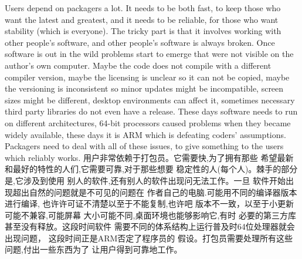 Users depend on packagers a lot. It needs to be both fast, to keep those who
want the latest and greatest, and it needs to be reliable, for those who want
stability (which is everyone). The tricky part is that it involves working with
other people’s software, and other people’s software is always broken. Once
software is out in the wild problems start to emerge that were not visible on
the author’s own computer. Maybe the code does not compile with a different
compiler version, maybe the licensing is unclear so it can not be copied, maybe
the versioning is inconsistent so minor updates might be incompatible, screen
sizes might be different, desktop environments can affect it, sometimes
necessary third party libraries do not even have a release. These days software
needs to run on different architectures, 64-bit processors caused problems when
they became widely available, these days it is ARM which is defeating coders’
assumptions. Packagers need to deal with all of these issues, to give something
to the users which reliably works.
用户非常依赖于打包员。它需要快,为了拥有那些
希望最新和最好的特性的人们,它需要可靠,对于那些想要
稳定性的人(每个人)。棘手的部分是,它涉及到使用
别人的软件,还有别人的软件出现问无法工作。一旦
软件开始出现超出自然的问题就是不可见的问题在
作者自己的电脑.可能用不同的编译器版本进行编译,
也许许可证不清楚以至于不能复制,也许吧
版本不一致，以至于小更新可能不兼容,可能屏幕
大小可能不同,桌面环境也能够影响它,有时
必要的第三方库甚至没有释放。这段时间软件
需要不同的体系结构上运行普及时64位处理器就会出现问题，
这段时间正是ARM否定了程序员的
假设。打包员需要处理所有这些问题,付出一些东西为了
让用户得到可靠地工作。

